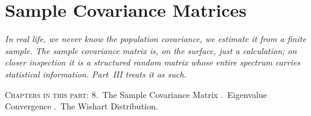 \part{Sample Covariance Matrices}

\begin{fullwidth}
\noindent\textit{In real life, we never know the population covariance, we estimate it from a finite sample. The \emph{sample covariance matrix} is, on the surface, just a calculation; on closer inspection it is a structured random matrix whose entire spectrum carries statistical information. Part~III treats it as such.}

\medskip
\noindent\textsc{Chapters in this part:} 8.~The Sample Covariance Matrix .~Eigenvalue Convergence .~The Wishart Distribution.
\end{fullwidth}

